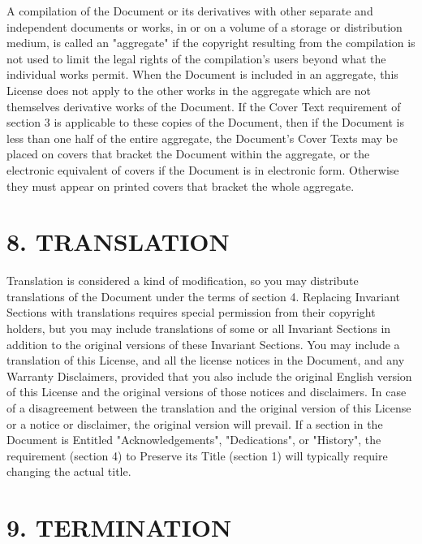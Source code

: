 A compilation of the Document or its derivatives with other separate and independent documents or works, in or on a volume of a storage or distribution medium, is called an "aggregate" if the copyright resulting from the compilation is not used to limit the legal rights of the compilation's users beyond what the individual works permit. When the Document is included in an aggregate, this License does not apply to the other works in the aggregate which are not themselves derivative works of the Document.
If the Cover Text requirement of section 3 is applicable to these copies of the Document, then if the Document is less than one half of the entire aggregate, the Document's Cover Texts may be placed on covers that bracket the Document within the aggregate, or the electronic equivalent of covers if the Document is in electronic form. Otherwise they must appear on printed covers that bracket the whole aggregate.

\section{8. TRANSLATION}


Translation is considered a kind of modification, so you may distribute translations of the Document under the terms of section 4. Replacing Invariant Sections with translations requires special permission from their copyright holders, but you may include translations of some or all Invariant Sections in addition to the original versions of these Invariant Sections. You may include a translation of this License, and all the license notices in the Document, and any Warranty Disclaimers, provided that you also include the original English version of this License and the original versions of those notices and disclaimers. In case of a disagreement between the translation and the original version of this License or a notice or disclaimer, the original version will prevail.
If a section in the Document is Entitled "Acknowledgements", "Dedications", or "History", the requirement (section 4) to Preserve its Title (section 1) will typically require changing the actual title.

\section{9. TERMINATION}


